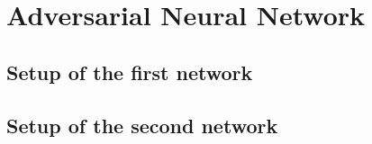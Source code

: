 \chapter{Adversarial Neural Network}
\section{Setup of the first network}
\section{Setup of the second network}
